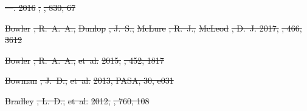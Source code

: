 \documentclass[numberedappendix]{emulateapj}
\providecommand{\DIFdel}[1]{{\protect\color{red}\sout{#1}}}                      %
\begin{document}
\DIFdel{---. 2016}%
\DIFdel{, }%
\DIFdel{, 830, 67
}%

\DIFdel{Bowler}%
\DIFdel{, R.~A.~A., }%
\DIFdel{Dunlop}%
\DIFdel{, J.~S., }%
\DIFdel{McLure}%
\DIFdel{, R.~J., }%
\DIFdel{McLeod}%
\DIFdel{, D.~J. 2017,
  }%
\DIFdel{, 466, 3612
}%

\DIFdel{Bowler}%
\DIFdel{, R.~A.~A., }%
\DIFdel{et~al.}%
\DIFdel{2015, }%
\DIFdel{, 452, 1817
}%

\DIFdel{Bowman}%
\DIFdel{, J.~D., }%
\DIFdel{et~al.}%
\DIFdel{2013, PASA, 30, e031
}%

\DIFdel{Bradley}%
\DIFdel{, L.~D., }%
\DIFdel{et~al.}%
\DIFdel{2012, }%
\DIFdel{, 760, 108
}%
\end{document}
